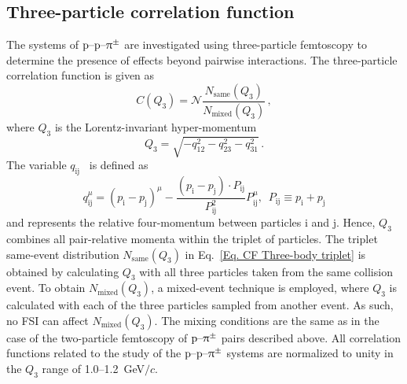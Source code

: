 \documentclass[ALICE,manyauthors]{cernphprep}
\begin{document}
\subsection{Three-particle correlation function}
\label{Sec. Three-particle correlation function}
The systems of $\text{p--p--}\uppi^\pm$ are investigated using three-particle femtoscopy to determine the presence of effects beyond pairwise interactions. The three-particle correlation function is given as
  \begin{equation}
     C(Q_3) = \mathcal{N} \frac{N_{\text{same}}(Q_3)}{N_{\text{mixed}}(Q_3)}  \,,\label{Eq. CF Three-body triplet}
 \end{equation}
where $Q_3$ is the Lorentz-invariant hyper-momentum~\cite{ALICE:3pi}
\begin{equation}
    Q_3 = \sqrt{-q_{12}^2-q_{23}^2-q_{31}^2}\,. \label{Eq. Q3 Definition}
\end{equation}
The variable $q_{\text{ij}}$~\cite{Lisa:2005dd} is defined as
\begin{equation}
    q_{\text{ij}}^\mu = (p_\text{i} - p_\text{j})^\mu - \frac{(p_\text{i} - p_\text{j})\cdot P_{\text{ij}}}{P_{\text{ij}}^2}P_{\text{ij}}^\mu, \, \, \, P_{\text{ij}} \equiv p_\text{i} + p_\text{j}
\end{equation}
and represents the relative four-momentum between particles i and j. Hence, $Q_3$ combines all pair-relative momenta within the triplet of particles. The triplet same-event distribution $N_{\text{same}}(Q_3)$ in Eq.~\eqref{Eq. CF Three-body triplet} is obtained by calculating $Q_3$ with all three particles taken from the same collision event. To obtain $N_{\text{mixed}}(Q_3)$, a mixed-event technique is employed, where $Q_3$ is calculated with each of the three particles sampled from another event. As such, no FSI can affect $N_{\text{mixed}}(Q_3)$. The mixing conditions are the same as in the case of the two-particle femtoscopy of $\text{p--}\uppi^\pm$ pairs described above. All correlation functions related to the study of the $\text{p--p--}\uppi^\pm$ systems are normalized to unity in the $Q_3$ range of 1.0--1.2~GeV$/c$.
\end{document}
